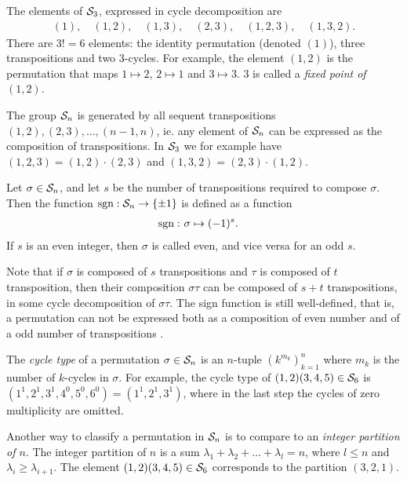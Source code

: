 \begin{example}
	The elements of $\mathcal{S}_3$, expressed in cycle decomposition are
	\begin{align*}
		(1),\quad (1,2), \quad(1,3), \quad(2,3), \quad(1,2,3), \quad(1,3,2).
	\end{align*}
	There are $3! = 6$ elements: the identity permutation (denoted $(1)$), three transpositions and two 3-cycles. For example, the element $(1,2)$ is the permutation that maps $1 \mapsto 2$, $2 \mapsto 1$ and $3 \mapsto 3$. 3 is called a \textit{fixed point of $(1,2)$}.
\end{example}

\begin{note}
	The group $\mathcal{S}_n$ is generated by all sequent transpositions $(1,2), (2,3), \dots, (n-1,n)$, ie. any element of $\mathcal{S}_n$ can be expressed as the composition of transpositions. In $\mathcal{S}_3$ we for example have $(1,2,3) = (1,2)\cdot(2,3)$ and $(1,3,2) = (2,3)\cdot(1,2)$.
\end{note}

\begin{definition}
	Let $\sigma \in \mathcal{S}_n$, and let $s$ be the number of transpositions required to compose $\sigma$. Then the function $\text{sgn}: \mathcal{S}_n \rightarrow \{\pm 1\}$ is defined as a function
	\begin{align*}
		\text{sgn}: & \ \sigma \mapsto (-1)^s.
	\end{align*}
	If $s$ is an even integer, then $\sigma$ is called even, and vice versa for an odd $s$.
\end{definition}

Note that if $\sigma$ is composed of $s$ transpositions and $\tau$ is composed of $t$ transposition, then their composition $\sigma\tau$ can be composed of $s+t$ transpositions, in some cycle decomposition of $\sigma\tau$. The sign function is still well-defined, that is, a permutation can not be expressed both as a composition of even number and of a odd number of transpositions \cite[Thm.12.6.1.]{Biggs}.

The \textit{cycle type} of a permutation $\sigma \in \mathcal{S}_n$ is an $n$-tuple $(k^{m_k})_{k=1}^n$ where $m_k$ is the number of $k$-cycles in $\sigma$. For example, the cycle type of $(1,2)(3,4,5) \in \mathcal{S}_6$ is $(1^1, 2^1, 3^1, 4^0, 5^0, 6^0) = (1^1, 2^1, 3^1)$, where in the last step the cycles of zero multiplicity are omitted.

Another way to classify a permutation in $\mathcal{S}_n$ is to compare to an \textit{integer partition of $n$}. The integer partition of $n$ is a sum $\lambda_1+ \lambda_2+ \dots+ \lambda_l = n$, where $l \leq n$ and $\lambda_i \geq \lambda_{i+1}$. The element $(1,2)(3,4,5) \in \mathcal{S}_6$ corresponds to the partition $(3,2,1)$.  

